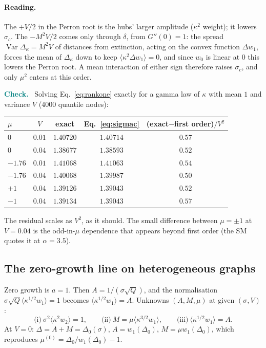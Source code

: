 \documentclass[11pt]{article}
\newcommand{\Var}{\operatorname{Var}}
\newenvironment{verify}{\par\medskip\noindent\textcolor{teal}{\textbf{Check.}}\ }{\par\medskip}
\begin{document}
\paragraph{Reading.}  The $+V/2$ in the Perron root is the hubs' larger amplitude ($\kappa^2$ weight); it lowers $\sigma_c$.
The $-M^2V/2$ comes only through $\delta$, from $G''(0)=1$: the spread $\Var\Delta_\kappa=M^2V$ of distances from extinction,
acting on the convex function $\Delta w_1$, forces the mean of $\Delta_\kappa$ down to keep $\langle\kappa^2\Delta w_1\rangle=0$, and
since $w_0$ is linear at $0$ this lowers the Perron root.  A mean interaction of either sign therefore raises $\sigma_c$, and
only $\mu^2$ enters at this order.

\begin{verify}
Solving Eq.~\eqref{eq:rankone} exactly for a gamma law of $\kappa$ with mean $1$ and variance $V$
(4000 quantile nodes):
\begin{center}
\begin{tabular}{lcccc}
\toprule
$\mu$ & $V$ & exact & Eq.~\eqref{eq:sigmac} & (exact$-$first order)$/V^2$\\
\midrule
$0$ & $0.01$ & $1.40720$ & $1.40714$ & $0.57$\\
$0$ & $0.04$ & $1.38677$ & $1.38593$ & $0.52$\\
$-1.76$ & $0.01$ & $1.41068$ & $1.41063$ & $0.54$\\
$-1.76$ & $0.04$ & $1.40068$ & $1.39987$ & $0.50$\\
$+1$ & $0.04$ & $1.39126$ & $1.39043$ & $0.52$\\
$-1$ & $0.04$ & $1.39134$ & $1.39043$ & $0.57$\\
\bottomrule
\end{tabular}
\end{center}
The residual scales as $V^2$, as it should.  The small difference between $\mu=\pm1$ at $V=0.04$ is the
odd-in-$\mu$ dependence that appears beyond first order (the SM quotes it at $\alpha=3.5$).
\end{verify}

\subsection{The zero-growth line on heterogeneous graphs}

Zero growth is $a=1$.  Then $A=1/(\sigma\sqrt Q)$, and the normalisation $\sigma\sqrt Q\langle\kappa^{1/2}w_1\rangle=1$ becomes
$\langle\kappa^{1/2}w_1\rangle=A$.  Unknowns $(A,M,\mu)$ at given $(\sigma,V)$:
\begin{equation}
\text{(i)}\ \sigma^2\langle\kappa^2w_2\rangle=1,\qquad \text{(ii)}\ M=\mu\langle\kappa^{3/2}w_1\rangle,\qquad \text{(iii)}\ \langle\kappa^{1/2}w_1\rangle=A .
\end{equation}
At $V=0$: $\Delta=A+M=\Delta_0(\sigma)$, $A=w_1(\Delta_0)$, $M=\mu w_1(\Delta_0)$, which reproduces $\mu^{(0)}=\Delta_0/w_1(\Delta_0)-1$.
\end{document}
